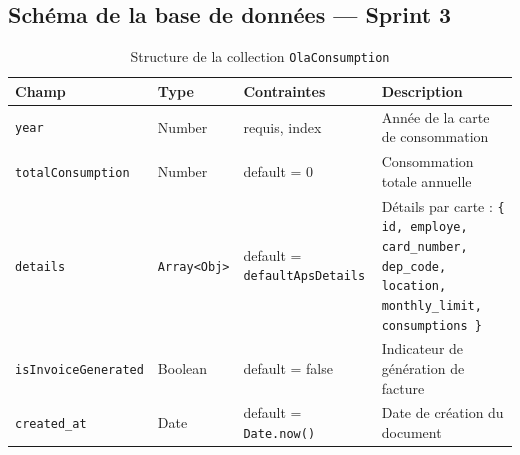 \documentclass[a4paper,11pt]{report}
\begin{document}
\subsection{Schéma de la base de données — Sprint 3}

\begin{table}[ht]
  \centering
  \small
  \caption{Structure de la collection \texttt{OlaConsumption}}
  \label{tab:olaconsumption-schema}
  \begin{tabularx}{\textwidth}{l X l X}
    \toprule
    \bf Champ                 & \bf Type                                      & \bf Contraintes                    & \bf Description                                                    \\
    \midrule
    \texttt{year}             & Number                                       & requis, index                      & Année de la carte de consommation                                  \\
    \addlinespace
    \texttt{totalConsumption} & Number                                       & default = 0                        & Consommation totale annuelle                                       \\
    \addlinespace
    \texttt{details}          & \texttt{Array\textless{}Obj\textgreater{}}   & default = \texttt{defaultApsDetails} & Détails par carte : \texttt{\{ id, employe, card\_number, dep\_code, location, monthly\_limit, consumptions \}} \\
    \addlinespace
    \texttt{isInvoiceGenerated}& Boolean                                     & default = false                   & Indicateur de génération de facture                                 \\
    \addlinespace
    \texttt{created\_at}      & Date                                         & default = \texttt{Date.now()}     & Date de création du document                                       \\
    \bottomrule
  \end{tabularx}
\end{table}

\vspace{1em}
\end{document}
